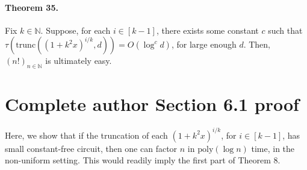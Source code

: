 \documentclass[10pt,a4paper]{article}
\begin{document}
\paragraph{Theorem 35.} Fix $k\in\mathbb N$. Suppose, for each $i\in[k-1]$, there exists some constant $c$ such that $\tau(\mathrm{trunc}((1+k^2x)^{i/k},d))=O(\log^cd)$, for large enough $d$. Then, $(n!)_{n\in\mathbb N}$ is ultimately easy.

\section*{Complete author Section 6.1 proof}
Here, we show that if the truncation of each $(1+k^2x)^{i/k}$, for $i\in[k-1]$, has small constant-free circuit, then one can factor $n$ in $\mathrm{poly}(\log n)$ time, in the non-uniform setting. This would readily imply the first part of Theorem 8.
\end{document}
